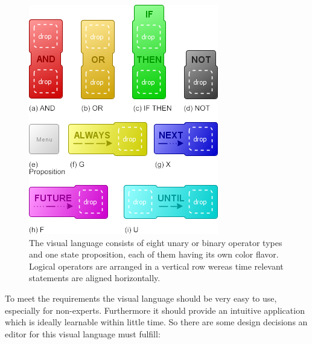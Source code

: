 \documentclass[conference]{IEEEtran}
\begin{document}
\begin{figure}[htbp]
  \centering
  \includegraphics[scale=0.5]{table}
  \caption{The visual language consists of eight unary or binary operator types and one state proposition, each of them having its own color flavor. Logical operators are arranged in a vertical row wereas time relevant statements are aligned horizontally.}
  \label{fig:operators}
\end{figure}



To meet the requirements the visual language should be very easy to use, especially for non-experts. Furthermore it should provide an intuitive application which is ideally learnable within little time. So there are some design decisions an editor for this visual language must fulfill:
\end{document}
